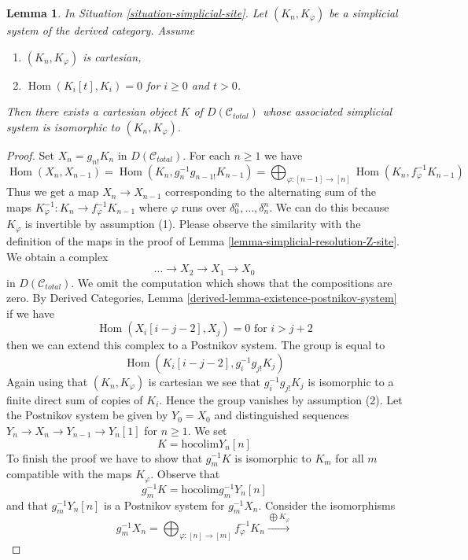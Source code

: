 \documentclass{stacks-project}
\theoremstyle{plain}
\newtheorem{lemma}[subsection]{Lemma}
\theoremstyle{definition}
\theoremstyle{remark}
\numberwithin{equation}{subsection}
\def\Hom{\mathop{\mathrm{Hom}}\nolimits}
\begin{document}
\begin{lemma}
\label{lemma-cartesian-object-derived-from-simplicial}
In Situation \ref{situation-simplicial-site}. Let
$(K_n, K_\varphi)$ be a simplicial system of the derived category.
Assume
\begin{enumerate}
\item $(K_n, K_\varphi)$ is cartesian,
\item $\Hom(K_i[t], K_i) = 0$ for $i \geq 0$ and $t > 0$.
\end{enumerate}
Then there exists a cartesian object $K$ of $D(\mathcal{C}_{total})$
whose associated simplicial system is isomorphic to $(K_n, K_\varphi)$.
\end{lemma}

\begin{proof}
Set $X_n = g_{n!}K_n$ in $D(\mathcal{C}_{total})$. For each $n \geq 1$
we have
$$
\Hom(X_n, X_{n - 1}) =
\Hom(K_n, g_n^{-1}g_{n - 1!}K_{n - 1}) =
\bigoplus\nolimits_{\varphi : [n - 1] \to [n]}
\Hom(K_n, f_\varphi^{-1}K_{n - 1})
$$
Thus we get a map $X_n \to X_{n - 1}$ corresponding to the
alternating sum of the maps
$K_\varphi^{-1} : K_n \to f_\varphi^{-1}K_{n - 1}$
where $\varphi$ runs over $\delta^n_0, \ldots, \delta^n_n$.
We can do this because $K_\varphi$ is invertible by assumption (1).
Please observe the similarity with the definition of the maps
in the proof of Lemma \ref{lemma-simplicial-resolution-Z-site}.
We obtain a complex
$$
\ldots \to X_2 \to X_1 \to X_0
$$
in $D(\mathcal{C}_{total})$. We omit the computation which shows
that the compositions are zero. By
Derived Categories, Lemma \ref{derived-lemma-existence-postnikov-system}
if we have
$$
\Hom(X_i[i - j - 2], X_j) = 0\text{ for }i > j + 2
$$
then we can extend this complex to a Postnikov system.
The group is equal to
$$
\Hom(K_i[i - j - 2], g_i^{-1}g_{j!}K_j)
$$
Again using that $(K_n, K_\varphi)$ is cartesian we see that
$g_i^{-1}g_{j!}K_j$ is isomorphic to a finite direct sum of copies of
$K_i$. Hence the group vanishes by assumption (2).
Let the Postnikov system be given by $Y_0 = X_0$ and distinguished
sequences $Y_n \to X_n \to Y_{n - 1} \to Y_n[1]$ for $n \geq 1$.
We set
$$
K = \text{hocolim} Y_n[n]
$$
To finish the proof we have to show that $g_m^{-1}K$ is isomorphic
to $K_m$ for all $m$ compatible with the maps $K_\varphi$. Observe that
$$
g_m^{-1} K = \text{hocolim} g_m^{-1}Y_n[n]
$$
and that $g_m^{-1}Y_n[n]$ is a Postnikov system for $g_m^{-1}X_n$.
Consider the isomorphisms
$$
g_m^{-1}X_n =
\bigoplus\nolimits_{\varphi : [n] \to [m]} f_\varphi^{-1}K_n
\xrightarrow{\bigoplus K_\varphi}
$$
\end{proof}
\end{document}

